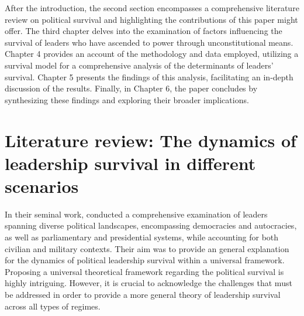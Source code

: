 \documentclass[
  12pt,
  a4paper,
  12pt]{article}
\begin{document}
After the introduction, the second section encompasses a comprehensive
literature review on political survival and highlighting the
contributions of this paper might offer. The third chapter delves into
the examination of factors influencing the survival of leaders who have
ascended to power through unconstitutional means. Chapter 4 provides an
account of the methodology and data employed, utilizing a survival model
for a comprehensive analysis of the determinants of leaders' survival.
Chapter 5 presents the findings of this analysis, facilitating an
in-depth discussion of the results. Finally, in Chapter 6, the paper
concludes by synthesizing these findings and exploring their broader
implications.

\section{Literature review: The dynamics of leadership survival in
different
scenarios}\label{literature-review-the-dynamics-of-leadership-survival-in-different-scenarios}

In their seminal work, \citet{buenodemesquita2003} conducted a
comprehensive examination of leaders spanning diverse political
landscapes, encompassing democracies and autocracies, as well as
parliamentary and presidential systems, while accounting for both
civilian and military contexts. Their aim was to provide an general
explanation for the dynamics of political leadership survival within a
universal framework. Proposing a universal theoretical framework
regarding the political survival is highly intriguing. However, it is
crucial to acknowledge the challenges that must be addressed in order to
provide a more general theory of leadership survival across all types of
regimes.
\end{document}
